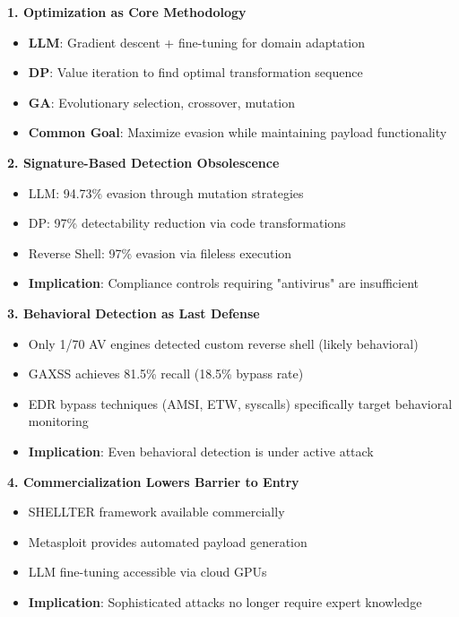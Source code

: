 \documentclass[11pt,conference]{IEEEtran}
\begin{document}
\textbf{1. Optimization as Core Methodology}
\begin{itemize}
    \item \textbf{LLM}: Gradient descent + fine-tuning for domain adaptation
    \item \textbf{DP}: Value iteration to find optimal transformation sequence
    \item \textbf{GA}: Evolutionary selection, crossover, mutation
    \item \textbf{Common Goal}: Maximize evasion while maintaining payload functionality
\end{itemize}

\textbf{2. Signature-Based Detection Obsolescence}
\begin{itemize}
    \item LLM: 94.73\% evasion through mutation strategies
    \item DP: 97\% detectability reduction via code transformations
    \item Reverse Shell: 97\% evasion via fileless execution
    \item \textbf{Implication}: Compliance controls requiring "antivirus" are insufficient
\end{itemize}

\textbf{3. Behavioral Detection as Last Defense}
\begin{itemize}
    \item Only 1/70 AV engines detected custom reverse shell (likely behavioral)
    \item GAXSS achieves 81.5\% recall (18.5\% bypass rate)
    \item EDR bypass techniques (AMSI, ETW, syscalls) specifically target behavioral monitoring
    \item \textbf{Implication}: Even behavioral detection is under active attack
\end{itemize}

\textbf{4. Commercialization Lowers Barrier to Entry}
\begin{itemize}
    \item SHELLTER framework available commercially
    \item Metasploit provides automated payload generation
    \item LLM fine-tuning accessible via cloud GPUs
    \item \textbf{Implication}: Sophisticated attacks no longer require expert knowledge
\end{itemize}
\end{document}
